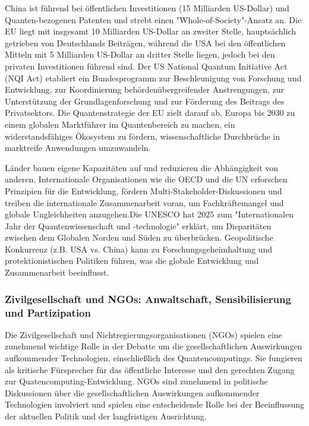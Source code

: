 China ist führend bei öffentlichen Investitionen (15 Milliarden US-Dollar) und Quanten-bezogenen Patenten und strebt einen "Whole-of-Society"-Ansatz an. Die EU liegt mit insgesamt 10 Milliarden US-Dollar an zweiter Stelle, hauptsächlich getrieben von Deutschlands Beiträgen, während die USA bei den öffentlichen Mitteln mit 5 Milliarden US-Dollar an dritter Stelle liegen, jedoch bei den privaten Investitionen führend sind.\cite{noauthor_europes_2025} Der US National Quantum Initiative Act (NQI Act) etabliert ein Bundesprogramm zur Beschleunigung von Forschung und Entwicklung, zur Koordinierung behördenübergreifender Anstrengungen, zur Unterstützung der Grundlagenforschung und zur Förderung des Beitrags des Privatsektors.\cite{petta_coherent_2005} Die Quantenstrategie der EU zielt darauf ab, Europa bis 2030 zu einem globalen Marktführer im Quantenbereich zu machen, ein widerstandsfähiges Ökosystem zu fördern, wissenschaftliche Durchbrüche in marktreife Anwendungen umzuwandeln.\cite{noauthor_national_nodate}\cite{seskir_democratization_2023}

Länder bauen eigene Kapazitäten auf und reduzieren die Abhängigkeit von anderen. Internationale Organisationen wie die OECD und die UN erforschen Prinzipien für die Entwicklung, fördern Multi-Stakeholder-Diskussionen und treiben die internationale Zusammenarbeit voran, um Fachkräftemangel und globale Ungleichheiten anzugehen.\cite{noauthor_quantum_nodate-7}Die UNESCO hat 2025 zum "Internationalen Jahr der Quantenwissenschaft und -technologie" erklärt, um Disparitäten zwischen dem Globalen Norden und Süden zu überbrücken.\cite{noauthor_opening_2025} Geopolitische Konkurrenz (z.B. USA vs. China) kann zu Forschungsgeheimhaltung und protektionistischen Politiken führen, was die globale Entwicklung und Zusammenarbeit beeinflusst.\cite{noauthor_europes_2025}

\subsubsection{Zivilgesellschaft und NGOs: Anwaltschaft, Sensibilisierung und Partizipation}
Die Zivilgesellschaft und Nichtregierungsorganisationen (NGOs) spielen eine zunehmend wichtige Rolle in der Debatte um die gesellschaftlichen Auswirkungen aufkommender Technologien, einschließlich des Quantencomputings. Sie fungieren als kritische Fürsprecher für das öffentliche Interesse und den gerechten Zugang zur Quatencomputing-Entwicklung. NGOs sind zunehmend in politische Diskussionen über die gesellschaftlichen Auswirkungen aufkommender Technologien involviert und spielen eine entscheidende Rolle bei der Beeinflussung der aktuellen Politik und der langfristigen Ausrichtung.

